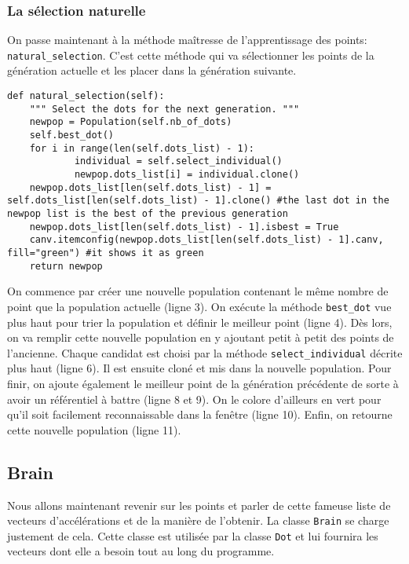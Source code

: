 \documentclass[12pt, a4paper, openany]{book}
\begin{document}
\subsubsection{La sélection naturelle}
On passe maintenant à la méthode maîtresse de l'apprentissage des points: \verb'natural_selection'. C'est cette méthode qui va sélectionner les points de la génération actuelle et les placer dans la génération suivante.
\begin{verbatim}
def natural_selection(self):
	""" Select the dots for the next generation. """
	newpop = Population(self.nb_of_dots)
	self.best_dot()
	for i in range(len(self.dots_list) - 1):
			individual = self.select_individual()
			newpop.dots_list[i] = individual.clone()
	newpop.dots_list[len(self.dots_list) - 1] = self.dots_list[len(self.dots_list) - 1].clone()	#the last dot in the newpop list is the best of the previous generation
	newpop.dots_list[len(self.dots_list) - 1].isbest = True
	canv.itemconfig(newpop.dots_list[len(self.dots_list) - 1].canv, fill="green") #it shows it as green
	return newpop
\end{verbatim}
On commence par créer une nouvelle population contenant le même nombre de point que la population actuelle (ligne 3). On exécute la méthode \verb'best_dot' vue plus haut pour trier la population et définir le meilleur point (ligne 4). Dès lors, on va remplir cette nouvelle population en y ajoutant petit à petit des points de l'ancienne. Chaque candidat est choisi par la méthode \verb'select_individual' décrite plus haut (ligne 6). Il est ensuite cloné et mis dans la nouvelle population. Pour finir, on ajoute également le meilleur point de la génération précédente de sorte à avoir un référentiel à battre (ligne 8 et 9). On le colore d’ailleurs en vert pour qu'il soit facilement reconnaissable dans la fenêtre (ligne 10). Enfin, on retourne cette nouvelle population (ligne 11).

\subsection{Brain}
Nous allons maintenant revenir sur les points et parler de cette fameuse liste de vecteurs d'accélérations et de la manière de l'obtenir. La classe \verb'Brain' se charge justement de cela. Cette classe est utilisée par la classe \verb'Dot' et lui fournira les vecteurs dont elle a besoin tout au long du programme.
\end{document}
